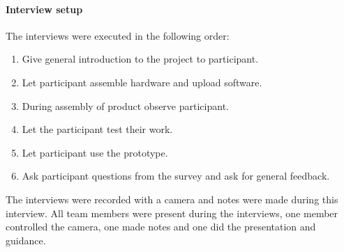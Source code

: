 \documentclass[conference]{IEEEtran}
\begin{document}
	\paragraph{Interview setup} The interviews were executed in the following order:
		\begin{enumerate}
			\item Give general introduction to the project to participant.
			\item Let participant assemble hardware and upload software.
			\item During assembly of product observe participant.
			\item Let the participant test their work.
			\item Let participant use the prototype.
			\item Ask participant questions from the survey and ask for general feedback.
		\end{enumerate}
		The interviews were recorded with a camera and notes were made during this interview. All team members were present during the interviews, one member controlled the camera, one made notes and one did the presentation and guidance.
\end{document}
